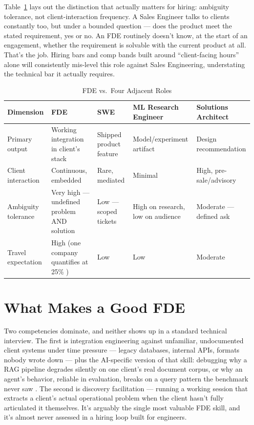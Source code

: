 \documentclass[journal]{IEEEtran}
\begin{document}
Table~\ref{tab:matrix} lays out the distinction that actually matters for hiring: ambiguity tolerance, not client-interaction frequency. A Sales Engineer talks to clients constantly too, but under a bounded question --- does the product meet the stated requirement, yes or no. An FDE routinely doesn't know, at the start of an engagement, whether the requirement is solvable with the current product at all. That's the job. Hiring bars and comp bands built around ``client-facing hours'' alone will consistently mis-level this role against Sales Engineering, understating the technical bar it actually requires.

\begin{table}[t]
\caption{FDE vs.\ Four Adjacent Roles}
\label{tab:matrix}
\centering
\footnotesize
\begin{tabular}{p{2.1cm}p{3.4cm}p{2.9cm}p{3.4cm}p{3.4cm}}
\toprule
\textbf{Dimension} & \textbf{FDE} & \textbf{SWE} & \textbf{ML Research Engineer} & \textbf{Solutions Architect} \\
\midrule
Primary output & Working integration in client's stack & Shipped product feature & Model/experiment artifact & Design recommendation \\
Client interaction & Continuous, embedded & Rare, mediated & Minimal & High, pre-sale/advisory \\
Ambiguity tolerance & Very high --- undefined problem AND solution & Low --- scoped tickets & High on research, low on audience & Moderate --- defined ask \\
Travel expectation & High (one company quantifies at 25\% \cite{anthropic2026fde}) & Low & Low & Moderate \\
\bottomrule
\end{tabular}
\end{table}

\section{What Makes a Good FDE}
\label{sec:competency}

Two competencies dominate, and neither shows up in a standard technical interview. The first is integration engineering against unfamiliar, undocumented client systems under time pressure --- legacy databases, internal APIs, formats nobody wrote down --- plus the AI-specific version of that skill: debugging why a RAG pipeline degrades silently on one client's real document corpus, or why an agent's behavior, reliable in evaluation, breaks on a query pattern the benchmark never saw \cite{karakurt2026rag,mohammadi2025llmagentsurvey,brehme2025ragtrust}. The second is discovery facilitation --- running a working session that extracts a client's actual operational problem when the client hasn't fully articulated it themselves. It's arguably the single most valuable FDE skill, and it's almost never assessed in a hiring loop built for engineers.
\end{document}
